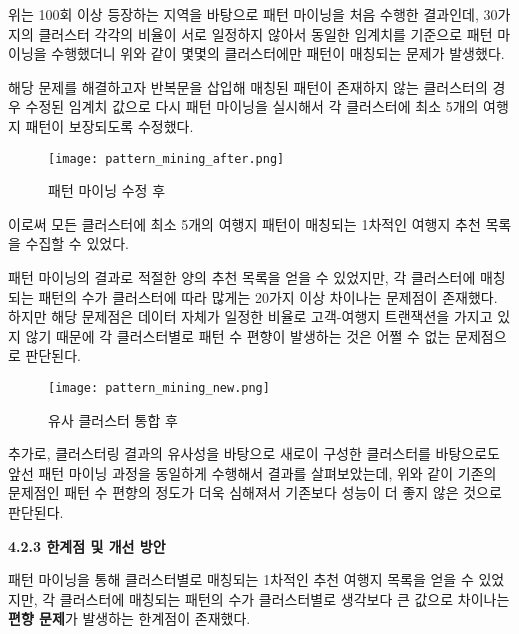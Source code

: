 \documentclass[sigconf]{acmart}
\begin{document}
\begin{CJK}{UTF8}{mj}
\vspace{0.5em}

위는 100회 이상 등장하는 지역을 바탕으로 패턴 마이닝을 처음 수행한 결과인데, 30가지의 클러스터 각각의 비율이 서로 일정하지 않아서 동일한 임계치를 기준으로 패턴 마이닝을 수행했더니 위와 같이 몇몇의 클러스터에만 패턴이 매칭되는 문제가 발생했다.

해당 문제를 해결하고자 반복문을 삽입해 매칭된 패턴이 존재하지 않는 클러스터의 경우 수정된 임계치 값으로 다시 패턴 마이닝을 실시해서 각 클러스터에 최소 5개의 여행지 패턴이 보장되도록 수정했다.

\begin{figure}[H]
  \centering
  \texttt{[image: pattern\_mining\_after.png]}
  \caption{패턴 마이닝 수정 후}
  \label{fig:pattern_mining_after}
\end{figure}

\vspace{0.5em}

이로써 모든 클러스터에 최소 5개의 여행지 패턴이 매칭되는 1차적인 여행지 추천 목록을 수집할 수 있었다.

패턴 마이닝의 결과로 적절한 양의 추천 목록을 얻을 수 있었지만, 각 클러스터에 매칭되는 패턴의 수가 클러스터에 따라 많게는 20가지 이상 차이나는 문제점이 존재했다. 하지만 해당 문제점은 데이터 자체가 일정한 비율로 고객-여행지 트랜잭션을 가지고 있지 않기 때문에 각 클러스터별로 패턴 수 편향이 발생하는 것은 어쩔 수 없는 문제점으로 판단된다.

\begin{figure}[H]
  \centering
  \texttt{[image: pattern\_mining\_new.png]}
  \caption{유사 클러스터 통합 후}
  \label{fig:pattern_mining_new}
\end{figure}

\vspace{0.5em}

추가로, 클러스터링 결과의 유사성을 바탕으로 새로이 구성한 클러스터를 바탕으로도 앞선 패턴 마이닝 과정을 동일하게 수행해서 결과를 살펴보았는데, 위와 같이 기존의 문제점인 패턴 수 편향의 정도가 더욱 심해져서 기존보다 성능이 더 좋지 않은 것으로 판단된다.

\vspace{0.5em}
\noindent\textbf{4.2.3 한계점 및 개선 방안}\par
패턴 마이닝을 통해 클러스터별로 매칭되는 1차적인 추천 여행지 목록을 얻을 수 있었지만, 각 클러스터에 매칭되는 패턴의 수가 클러스터별로 생각보다 큰 값으로 차이나는 \textbf{편향 문제}가 발생하는 한계점이 존재했다.


\end{CJK}
\end{document}
